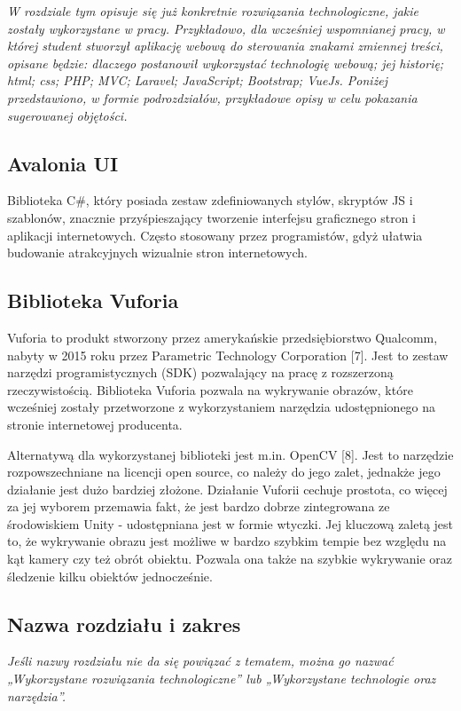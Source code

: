 \textit{W rozdziale tym opisuje się już konkretnie rozwiązania technologiczne, jakie zostały wykorzystane w pracy. Przykładowo, dla wcześniej wspomnianej pracy, w której student stworzył aplikację webową do sterowania znakami zmiennej treści, opisane będzie: dlaczego postanowił wykorzystać technologię webową; jej historię; html; css; PHP; MVC; Laravel; JavaScript; Bootstrap; VueJs. Poniżej przedstawiono, w formie podrozdziałów, przykładowe opisy w celu pokazania sugerowanej objętości.}

\subsection{Avalonia UI}
Biblioteka C\#, który posiada zestaw zdefiniowanych stylów, skryptów JS i szablonów, znacznie przyśpieszający tworzenie interfejsu graficznego stron i aplikacji internetowych. Często stosowany przez programistów, gdyż ułatwia budowanie atrakcyjnych wizualnie stron internetowych.

\subsection{Biblioteka Vuforia}
Vuforia to produkt stworzony przez amerykańskie przedsiębiorstwo Qualcomm, nabyty w 2015 roku przez  Parametric Technology Corporation [7]. Jest to zestaw narzędzi programistycznych (SDK) pozwalający na pracę z rozszerzoną rzeczywistością. Biblioteka Vuforia pozwala na wykrywanie obrazów, które wcześniej zostały przetworzone z wykorzystaniem narzędzia udostępnionego na stronie internetowej producenta. 

Alternatywą dla wykorzystanej biblioteki jest m.in. OpenCV [8]. Jest to narzędzie rozpowszechniane na licencji open source, co należy do jego zalet, jednakże jego działanie jest dużo bardziej złożone. Działanie Vuforii cechuje prostota, co więcej za jej wyborem przemawia fakt, że jest bardzo dobrze zintegrowana ze środowiskiem Unity - udostępniana jest w formie wtyczki. Jej kluczową zaletą jest to, że wykrywanie obrazu jest możliwe w bardzo szybkim tempie bez względu na kąt kamery czy też obrót obiektu. Pozwala ona także na szybkie wykrywanie oraz śledzenie kilku obiektów jednocześnie.

\subsection{Nazwa rozdziału i zakres}
\textit{Jeśli nazwy rozdziału nie da się powiązać z tematem, można go nazwać „Wykorzystane rozwiązania technologiczne” lub „Wykorzystane technologie oraz narzędzia”.}

